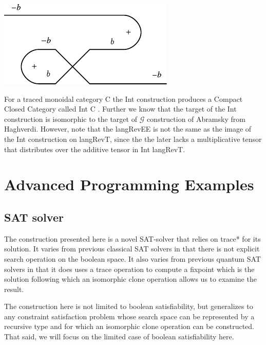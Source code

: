 \documentclass[preprint]{sigplanconf}
\newcommand{\G}{\ensuremath{\mathcal{G}}\xspace}
\begin{document}
\begin{itemize}
\begin{center}
  \includegraphics{diagrams/neg_circuit2.pdf}
\end{center}

\end{itemize}

For a traced monoidal category {{C}} the Int construction produces a
Compact Closed Category called Int {{C}} \cite{joyal1996traced}.
Further we know that the target of the Int construction is isomorphic
to the target of \G construction of Abramsky \cite{Abramsky96:0} from
Haghverdi. However, note that the {{langRevEE}} is not the same as the
image of the Int construction on {{langRevT}}, since the the later
lacks a multiplicative tensor that distributes over the additive tensor
in Int {{langRevT}}.

\section{Advanced Programming Examples}
\label{sec:prog}

\subsection{SAT solver}
\label{sec:sat-solver}

The construction presented here is a novel SAT-solver that relies on
{{trace*}} for its solution. It varies from previous classical SAT
solvers in that there is not explicit search operation on the boolean
space. It also varies from previous quantum SAT solvers in that it
does uses a {{trace}} operation to compute a fixpoint which is the
solution following which an isomorphic clone operation allows us to
examine the result.

The construction here is not limited to boolean satisfiability, but
generalizes to any constraint satisfaction problem whose search space
can be represented by a recursive type and for which an isomorphic
clone operation can be constructed. That said, we will focus on the
limited case of boolean satisfiability here. 
\end{document}
